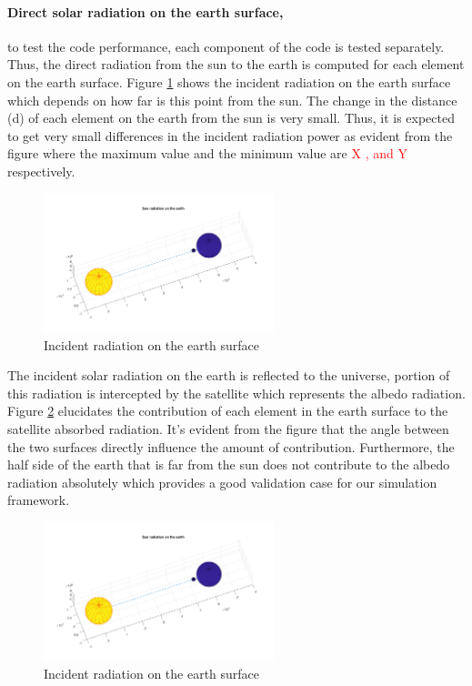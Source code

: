 \documentclass[11pt]{article}
\begin{document}
\paragraph{Direct solar radiation on the earth surface,} to test the code performance, each component of the code is tested separately. Thus, the direct radiation from the sun to the earth is computed for each element on the earth surface. Figure \ref{fig:solar-rad-on-earth} shows the incident radiation on the earth surface which depends on how far is this point from the sun. The change in the distance (d) of each element on the earth from the sun is very small. Thus, it is expected to get very small differences in the incident radiation power as evident from the figure where the maximum value and the minimum value are\textcolor{red}{ X , and Y} respectively. 

\begin{figure}[h]
    \centering
    \includegraphics[width = 0.6\textwidth]{Matlab/Sensitivity/fig_0_180.png}
    \caption{Incident radiation on the earth surface}
    \label{fig:solar-rad-on-earth}
\end{figure}


The incident solar radiation on the earth is reflected to the universe, portion of this radiation is intercepted by the satellite which represents the albedo radiation. Figure \ref{fig:albedo} elucidates the contribution of each element in the earth surface to the satellite absorbed radiation. It's evident from the figure that the angle between the two surfaces directly influence the amount of contribution. Furthermore, the half side of the earth that is far from the sun does not contribute to the albedo radiation absolutely which provides a good validation case for our simulation framework. 

\begin{figure}[h]
    \centering
    \includegraphics[width = 0.6\textwidth]{Matlab/Sensitivity/fig_0_180.png}
    \caption{Incident radiation on the earth surface}
    \label{fig:albedo}
\end{figure}
\end{document}
